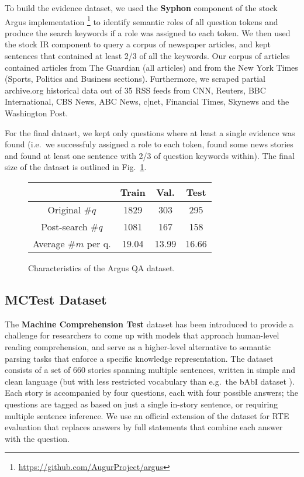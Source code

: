 \documentclass[11pt]{article}
\begin{document}
To build the evidence dataset, we used the \textbf{Syphon} component
\cite{argus}
of the stock Argus implementation%
\footnote{\url{https://github.com/AugurProject/argus}}
to identify semantic roles of all question tokens and produce
the search keywords if a role was assigned to each token.
We then used the stock IR component to query a corpus of newspaper
articles, and kept sentences that contained at least 2/3 of all
the keywords.
Our corpus of articles contained articles from The Guardian (all articles) and from the New York Times (Sports, Politics and Business sections).  Furthermore, we scraped partial archive.org historical data out of 35 RSS feeds from CNN, Reuters, BBC International, CBS News, ABC News, c|net, Financial Times, Skynews and the Washington Post.

For the final dataset, we kept only questions where at least
a single evidence was found (i.e.\ we successfuly assigned a role
to each token, found some news stories and found at least one
sentence with 2/3 of question keywords within).  The final size
of the dataset is outlined in Fig.~\ref{tab:dataset}.

\begin{figure}
	\centering
	\begin{tabular}{|c|ccc|}
		\hline
		& Train & Val. & Test \\
		\hline
		Original $\#q$ & 1829 & 303 & 295 \\
		Post-search $\#q$ & 1081 & 167 & 158 \\
		Average $\#m$ per q. & 19.04 & 13.99 & 16.66 \\
		\hline
	\end{tabular}
	\vspace*{-0.2cm}
	\caption{\footnotesize%
		Characteristics of the Argus QA dataset.
	}
	\label{tab:dataset}
\end{figure}


\subsection{MCTest Dataset}

The \textbf{Machine Comprehension Test} \cite{MCTest} dataset has been introduced
to provide a challenge for researchers to come up with models that approach
human-level reading comprehension, and serve as a higher-level alternative
to semantic parsing tasks that enforce a specific knowledge representation.
The dataset consists of a set of 660 stories spanning
multiple sentences, written in simple and clean language (but with less restricted
vocabulary than e.g.\ the bAbI dataset \cite{bAbI}).  Each story is accompanied
by four questions, each with four possible answers; the questions are tagged
as based on just a single in-story sentence, or requiring multiple sentence inference.
We use an official extension of the dataset for RTE evaluation
that replaces answers by full statements that combine each answer with the question.
\end{document}
